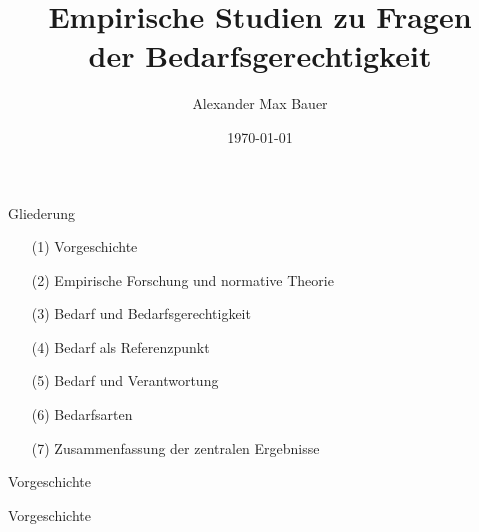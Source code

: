\documentclass[xcolor=table,9pt,aspectratio=169]{beamer}
\title{Empirische Studien zu Fragen\\der Bedarfsgerechtigkeit}
\subtitle{}
\author{Alexander Max Bauer}
\date{\renewcommand{\dateseparator}{.}\ddmmyyyydate\today}
\begin{document}
{
\begin{frame}
   \maketitle
\end{frame}
}


\begin{frame}{\vspace*{10mm}Gliederung}
\vspace*{-10mm}
\begin{itemize}
   \item[(1)] Vorgeschichte
   \item[(2)] Empirische Forschung und normative Theorie
   \item[(3)] Bedarf und Bedarfsgerechtigkeit
   \item[(4)] Bedarf als Referenzpunkt
   \item[(5)] Bedarf und Verantwortung
   \item[(6)] Bedarfsarten
   \item[(7)] Zusammenfassung der zentralen Ergebnisse
\end{itemize}
\end{frame}


\begin{frame}{\vspace*{10mm}Vorgeschichte}
\end{frame}


\begin{frame}{\vspace*{10mm}Vorgeschichte}
\end{frame}
\end{document}
